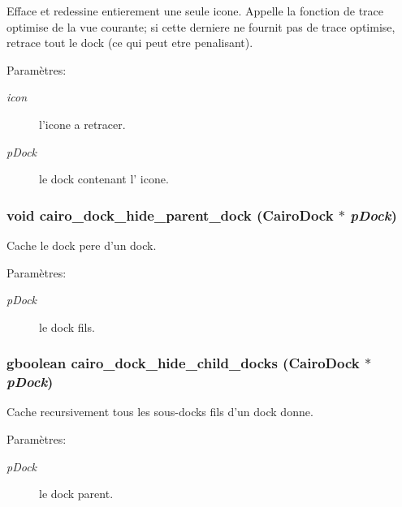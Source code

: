Efface et redessine entierement une seule icone. Appelle la fonction de trace optimise de la vue courante; si cette derniere ne fournit pas de trace optimise, retrace tout le dock (ce qui peut etre penalisant). \begin{Desc}
\item[Paramètres:]
\begin{description}
\item[{\em icon}]l'icone a retracer. \item[{\em pDock}]le dock contenant l' icone. \end{description}
\end{Desc}
\subsubsection{\setlength{\rightskip}{0pt plus 5cm}void cairo\_\-dock\_\-hide\_\-parent\_\-dock ({\bf CairoDock} $\ast$ {\em pDock})}\label{cairo-dock-draw_8h_883300022a42568b3565b9135e063ba3}


Cache le dock pere d'un dock. \begin{Desc}
\item[Paramètres:]
\begin{description}
\item[{\em pDock}]le dock fils. \end{description}
\end{Desc}
\subsubsection{\setlength{\rightskip}{0pt plus 5cm}gboolean cairo\_\-dock\_\-hide\_\-child\_\-docks ({\bf CairoDock} $\ast$ {\em pDock})}\label{cairo-dock-draw_8h_5f3268886844cf7c952d229c6d9b3782}


Cache recursivement tous les sous-docks fils d'un dock donne. \begin{Desc}
\item[Paramètres:]
\begin{description}
\item[{\em pDock}]le dock parent. \end{description}
\end{Desc}
